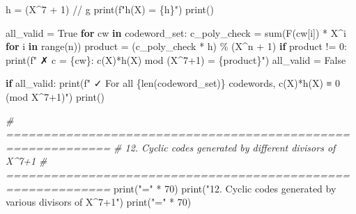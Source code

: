 \documentclass[
]{article}
\newenvironment{Shaded}{}{}
\newcommand{\BuiltInTok}[1]{\textcolor[rgb]{0.00,0.50,0.00}{#1}}
\newcommand{\CommentTok}[1]{\textcolor[rgb]{0.38,0.63,0.69}{\textit{#1}}}
\newcommand{\ControlFlowTok}[1]{\textcolor[rgb]{0.00,0.44,0.13}{\textbf{#1}}}
\newcommand{\DecValTok}[1]{\textcolor[rgb]{0.25,0.63,0.44}{#1}}
\newcommand{\KeywordTok}[1]{\textcolor[rgb]{0.00,0.44,0.13}{\textbf{#1}}}
\newcommand{\NormalTok}[1]{#1}
\newcommand{\OperatorTok}[1]{\textcolor[rgb]{0.40,0.40,0.40}{#1}}
\newcommand{\SpecialCharTok}[1]{\textcolor[rgb]{0.25,0.44,0.63}{#1}}
\newcommand{\SpecialStringTok}[1]{\textcolor[rgb]{0.73,0.40,0.53}{#1}}
\newcommand{\StringTok}[1]{\textcolor[rgb]{0.25,0.44,0.63}{#1}}
\newcommand{\VariableTok}[1]{\textcolor[rgb]{0.10,0.09,0.49}{#1}}
\begin{document}
\begin{Shaded}
\begin{Highlighting}[]
\NormalTok{h }\OperatorTok{=}\NormalTok{ (X}\OperatorTok{\^{}}\DecValTok{7} \OperatorTok{+} \DecValTok{1}\NormalTok{) }\OperatorTok{//}\NormalTok{ g}
\BuiltInTok{print}\NormalTok{(}\SpecialStringTok{f"h(X) = }\SpecialCharTok{\{}\NormalTok{h}\SpecialCharTok{\}}\SpecialStringTok{"}\NormalTok{)}
\BuiltInTok{print}\NormalTok{()}

\NormalTok{all\_valid }\OperatorTok{=} \VariableTok{True}
\ControlFlowTok{for}\NormalTok{ cw }\KeywordTok{in}\NormalTok{ codeword\_set:}
\NormalTok{    c\_poly\_check }\OperatorTok{=} \BuiltInTok{sum}\NormalTok{(F(cw[i]) }\OperatorTok{*}\NormalTok{ X}\OperatorTok{\^{}}\NormalTok{i }\ControlFlowTok{for}\NormalTok{ i }\KeywordTok{in} \BuiltInTok{range}\NormalTok{(n))}
\NormalTok{    product }\OperatorTok{=}\NormalTok{ (c\_poly\_check }\OperatorTok{*}\NormalTok{ h) }\OperatorTok{\%}\NormalTok{ (X}\OperatorTok{\^{}}\NormalTok{n }\OperatorTok{+} \DecValTok{1}\NormalTok{)}
    \ControlFlowTok{if}\NormalTok{ product }\OperatorTok{!=} \DecValTok{0}\NormalTok{:}
        \BuiltInTok{print}\NormalTok{(}\SpecialStringTok{f"  ✗ c = }\SpecialCharTok{\{}\NormalTok{cw}\SpecialCharTok{\}}\SpecialStringTok{: c(X)*h(X) mod (X\^{}7+1) = }\SpecialCharTok{\{}\NormalTok{product}\SpecialCharTok{\}}\SpecialStringTok{"}\NormalTok{)}
\NormalTok{        all\_valid }\OperatorTok{=} \VariableTok{False}

\ControlFlowTok{if}\NormalTok{ all\_valid:}
    \BuiltInTok{print}\NormalTok{(}\SpecialStringTok{f"  ✓ For all }\SpecialCharTok{\{}\BuiltInTok{len}\NormalTok{(codeword\_set)}\SpecialCharTok{\}}\SpecialStringTok{ codewords, c(X)*h(X) ≡ 0 (mod X\^{}7+1)"}\NormalTok{)}
\BuiltInTok{print}\NormalTok{()}

\CommentTok{\# ============================================================}
\CommentTok{\# 12. Cyclic codes generated by different divisors of X\^{}7+1}
\CommentTok{\# ============================================================}
\BuiltInTok{print}\NormalTok{(}\StringTok{"="} \OperatorTok{*} \DecValTok{70}\NormalTok{)}
\BuiltInTok{print}\NormalTok{(}\StringTok{"12. Cyclic codes generated by various divisors of X\^{}7+1"}\NormalTok{)}
\BuiltInTok{print}\NormalTok{(}\StringTok{"="} \OperatorTok{*} \DecValTok{70}\NormalTok{)}


\end{Highlighting}
\end{Shaded}
\end{document}
